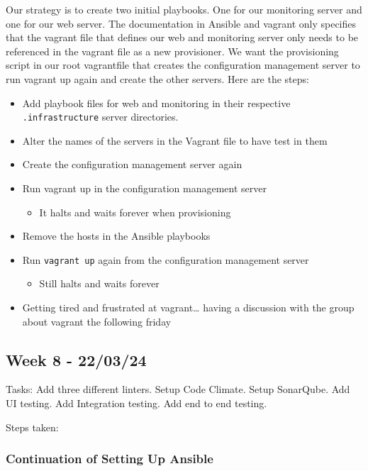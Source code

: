 Our strategy is to create two initial playbooks. One for our monitoring
server and one for our web server. The documentation in Ansible and
vagrant only specifies that the vagrant file that defines our web and
monitoring server only needs to be referenced in the vagrant file as a
new provisioner. We want the provisioning script in our root vagrantfile
that creates the configuration management server to run vagrant up again
and create the other servers. Here are the steps:

\begin{itemize}
    \item Add playbook files for web and monitoring in their respective \texttt{.infrastructure} server directories.
    \item Alter the names of the servers in the Vagrant file to have test in them
    \item Create the configuration management server again
    \item Run vagrant up in the configuration management server

    \begin{itemize}
        \item It halts and waits forever when provisioning
    \end{itemize}
    \item Remove the hosts in the Ansible playbooks
    \item Run \texttt{vagrant\ up} again from the configuration management server

    \begin{itemize}
        \item Still halts and waits forever
    \end{itemize}
    \item Getting tired and frustrated at vagrant\ldots{} having a discussion with the group about vagrant the following friday
\end{itemize}

\subsection{Week 8 - 22/03/24}
\label{log:week8}

Tasks: Add three different linters. Setup Code Climate. Setup SonarQube.
Add UI testing. Add Integration testing. Add end to end testing.

Steps taken:

\subsubsection{Continuation of Setting Up Ansible}
\label{log:continuation-of-setting-up-ansible}

